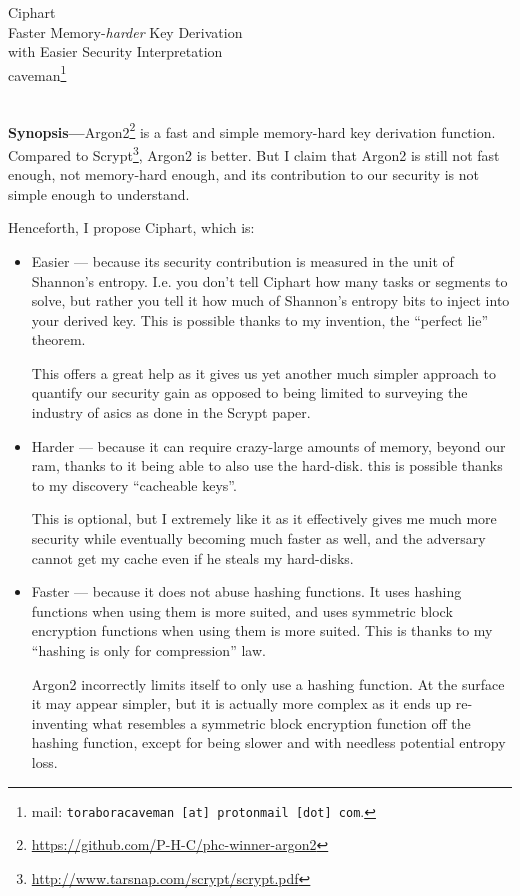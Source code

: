 \documentclass[twocolumn]{article}
\begin{document}
\SetInd{.15em}{1em}

\begin{center}
\Huge
Ciphart\\
\Large
Faster Memory-\emph{harder} Key Derivation \\
with Easier Security Interpretation\\
\normalsize
caveman\footnote{mail: \texttt{toraboracaveman [at] protonmail [dot]
com}.}\\
\footnotesize
\DTMnow\\
\end{center}

\noindent\textbf{Synopsis---}Argon2\footnote{\url{https://github.com/P-H-C/phc-winner-argon2}}
is a fast and simple memory-hard key derivation function.  Compared to
Scrypt\footnote{\url{http://www.tarsnap.com/scrypt/scrypt.pdf}}, Argon2 is
better.  But I claim that Argon2 is still not fast enough, not memory-hard
enough, and its contribution to our security is not simple enough to
understand.

Henceforth, I propose Ciphart, which is:
\begin{itemize}
    \item Easier --- because its security contribution is measured in the
    unit of Shannon's entropy.  I.e. you don't tell Ciphart how many
    tasks or segments to solve, but rather you tell it how much of
    Shannon's entropy bits to inject into your derived key.  This is
    possible thanks to my invention, the ``perfect lie'' theorem.

    This offers a great help as it gives us yet another much simpler
    approach to quantify our security gain as opposed to being limited to
    surveying the industry of \glspl{asic} as done in the Scrypt paper.

    \item Harder --- because it can require crazy-large amounts of memory,
    beyond our \gls{ram}, thanks to it being able to also use
    the hard-disk.  this is possible thanks to my discovery ``cacheable
    keys''.

    This is optional, but I extremely like it as it effectively gives me
    much more security while eventually becoming much faster as well, and
    the adversary cannot get my cache even if he steals my hard-disks.

    \item Faster --- because it does not abuse hashing functions.  It uses
    hashing functions when using them is more suited, and uses symmetric
    block encryption functions when using them is  more suited.  This is
    thanks to my ``hashing is only for compression'' law.

    Argon2 incorrectly limits itself to only use a hashing function.
    At the surface it may appear simpler, but it is actually more complex
    as it ends up re-inventing what resembles a symmetric block encryption
    function off the hashing function, except for being slower and with
    needless potential entropy loss.
\end{itemize}
\end{document}

